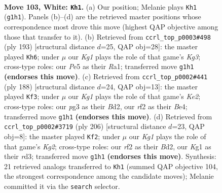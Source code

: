 \documentclass[11pt]{article}
\begin{document}
\clearpage

\begin{figure}[p]\centering
\begin{subfigure}{0.46\textwidth}\centering
\resizebox{\linewidth}{!}{%
\newchessgame
\chessboard[
  setfen={8/5pk1/6p1/4P3/1n3P2/1B4p1/5r2/6K1 w - - 4 103},
  showmover=false,
  pgfstyle=straightmove, color=movearrow, markmove={g1-h1}
]}
\caption{}
\end{subfigure}\hfill
\begin{subfigure}{0.46\textwidth}\centering
\resizebox{\linewidth}{!}{%
\newchessgame
\chessboard[
  setfen={8/8/6k1/5Rp1/6P1/7P/6K1/r7 b - - 33 97},
  showmover=false,
  pgfstyle=straightmove, color=movearrow, markmove={g6-h6}
]}
\caption{}
\end{subfigure}
\\[4pt]
\begin{subfigure}{0.46\textwidth}\centering
\resizebox{\linewidth}{!}{%
\newchessgame
\chessboard[
  setfen={8/3k1p2/4p1p1/4P1P1/4B1r1/8/3BK3/8 w - - 14 95},
  showmover=false,
  pgfstyle=straightmove, color=movearrow, markmove={e2-f3}
]}
\caption{}
\end{subfigure}\hfill
\begin{subfigure}{0.46\textwidth}\centering
\resizebox{\linewidth}{!}{%
\newchessgame
\chessboard[
  setfen={8/6k1/5p2/4pP2/2p1N1P1/3r4/3B2K1/8 w - - 62 104},
  showmover=false,
  pgfstyle=straightmove, color=movearrow, markmove={g2-f2}
]}
\caption{}
\end{subfigure}
\caption{\textbf{Move 103, White: \texttt{Kh1}.} (a) Our position; Melanie plays \texttt{Kh1} (\texttt{g1h1}). Panels (b)--(d) are the retrieved master positions whose correspondence most drove this move (highest QAP objective among those that transfer to it). (b) Retrieved from \texttt{ccrl\_top\_p0003\#498} (ply 193) [structural distance $d$=25, QAP obj=28]: the master played \texttt{Kh6}; under $\mu$ our \emph{Kg1} plays the role of that game's \emph{Kg3}; cross-type roles: our \emph{P}e5 as their \emph{R}a1; transferred move \texttt{g1h1} \textbf{(endorses this move)}. (c) Retrieved from \texttt{ccrl\_top\_p0002\#441} (ply 188) [structural distance $d$=24, QAP obj=13]: the master played \texttt{Kf3}; under $\mu$ our \emph{Kg1} plays the role of that game's \emph{Ke2}; cross-type roles: our \emph{p}g3 as their \emph{B}d2, our \emph{r}f2 as their \emph{B}e4; transferred move \texttt{g1h1} \textbf{(endorses this move)}. (d) Retrieved from \texttt{ccrl\_top\_p0002\#3719} (ply 206) [structural distance $d$=23, QAP obj=8]: the master played \texttt{Kf2}; under $\mu$ our \emph{Kg1} plays the role of that game's \emph{Kg2}; cross-type roles: our \emph{r}f2 as their \emph{B}d2, our \emph{K}g1 as their \emph{r}d3; transferred move \texttt{g1h1} \textbf{(endorses this move)}. Synthesis: 21 retrieved analogs transferred to \texttt{Kh1} (summed QAP objective 104, the strongest correspondence among the candidate moves); Melanie committed it via the \texttt{search} selector.}
\label{fig:thought-m204}
\end{figure}
\end{document}
